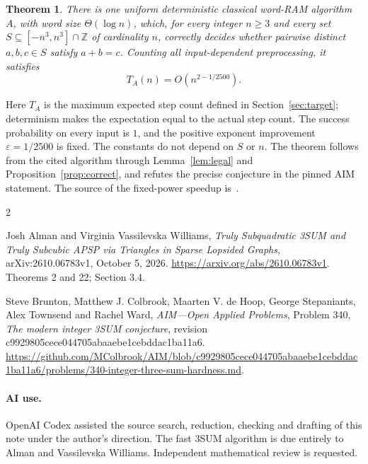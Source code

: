 \documentclass[11pt]{article}
\newtheorem{theorem}[lemma]{Theorem}
\begin{document}
\begin{theorem}\label{thm:main}
There is one uniform deterministic classical word-RAM algorithm $A$,
with word size $\Theta(\log n)$, which, for every integer $n\geq3$
and every set $S\subseteq[-n^3,n^3]\cap\mathbb Z$ of cardinality $n$,
correctly decides whether pairwise distinct $a,b,c\in S$ satisfy $a+b=c$.
Counting all input-dependent preprocessing, it satisfies
\[
 T_A(n)=O(n^{2-1/2500}).
\]
\end{theorem}

Here $T_A$ is the maximum expected step count defined in
Section~\ref{sec:target}; determinism makes the expectation equal to the
actual step count. The success probability on every input is $1$,
and the positive exponent improvement $\varepsilon=1/2500$ is fixed.
The constants do not depend on $S$ or $n$.
The theorem follows from the cited algorithm through
Lemma~\ref{lem:legal} and Proposition~\ref{prop:correct}, and
refutes the precise conjecture in the pinned AIM statement.
The source of the fixed-power speedup is~\cite{avw}.

\begin{thebibliography}{2}
\raggedright

Josh Alman and Virginia Vassilevska Williams,
\emph{Truly Subquadratic 3SUM and Truly Subcubic APSP via Triangles
in Sparse Lopsided Graphs},
arXiv:2610.06783v1, October 5, 2026.
\url{https://arxiv.org/abs/2610.06783v1}.
Theorems 2 and 22; Section 3.4.

Steve Brunton, Matthew J. Colbrook, Maarten V. de Hoop,
George Stepaniants, Alex Townsend and Rachel Ward,
\emph{AIM---Open Applied Problems}, Problem 340,
\emph{The modern integer 3SUM conjecture},
revision c9929805cece044705abaaebe1cebddac1ba11a6.
\url{https://github.com/MColbrook/AIM/blob/c9929805cece044705abaaebe1cebddac1ba11a6/problems/340-integer-three-sum-hardness.md}.

\end{thebibliography}

\paragraph{AI use.}
OpenAI Codex assisted the source search, reduction, checking and drafting
of this note under the author's direction.
The fast 3SUM algorithm is due entirely to Alman and Vassilevska Williams.
Independent mathematical review is requested.
\end{document}
